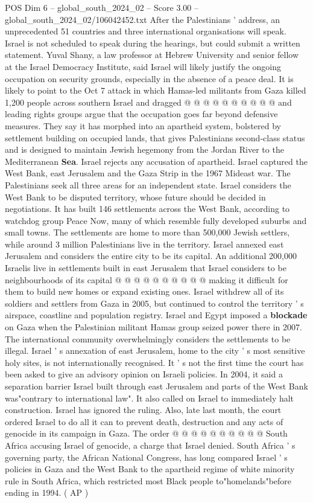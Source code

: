 \begin{textsample}{POS Dim 6 – global\_south\_2024\_02 – Score 3.00 – global\_south\_2024\_02/106042452.txt}
After the Palestinians ' address, an unprecedented 51 countries and three international organisations will speak.
Israel is not scheduled to speak during the hearings, but could submit a written statement.
Yuval Shany, a law professor at Hebrew University and senior fellow at the Israel Democracy Institute, said Israel will likely justify the ongoing occupation on security grounds, especially in the absence of a peace deal.
It is likely to point to the Oct 7 attack in which Hamas-led militants from Gaza killed 1,200 people across southern Israel and dragged @ @ @ @ @ @ @ @ @ @ and leading rights groups argue that the occupation goes far beyond defensive measures.
They say it has morphed into an apartheid system, bolstered by settlement building on occupied lands, that gives Palestinians second-class status and is designed to maintain Jewish hegemony from the Jordan River to the Mediterranean \textbf{Sea}.
Israel rejects any accusation of apartheid.
Israel captured the West Bank, east Jerusalem and the Gaza Strip in the 1967 Mideast war.
The Palestinians seek all three areas for an independent state.
Israel considers the West Bank to be disputed territory, whose future should be decided in negotiations.
It has built 146 settlements across the West Bank, according to watchdog group Peace Now, many of which resemble fully developed suburbs and small towns.
The settlements are home to more than 500,000 Jewish settlers, while around 3 million Palestinians live in the territory.
Israel annexed east Jerusalem and considers the entire city to be its capital.
An additional 200,000 Israelis live in settlements built in east Jerusalem that Israel considers to be neighbourhoods of its capital @ @ @ @ @ @ @ @ @ @ making it difficult for them to build new homes or expand existing ones.
Israel withdrew all of its soldiers and settlers from Gaza in 2005, but continued to control the territory ' s airspace, coastline and population registry.
Israel and Egypt imposed a \textbf{blockade} on Gaza when the Palestinian militant Hamas group seized power there in 2007.
The international community overwhelmingly considers the settlements to be illegal.
Israel ' s annexation of east Jerusalem, home to the city ' s most sensitive holy sites, is not internationally recognised.
It ' s not the first time the court has been asked to give an advisory opinion on Israeli policies.
In 2004, it said a separation barrier Israel built through east Jerusalem and parts of the West Bank was"contrary to international law".
It also called on Israel to immediately halt construction.
Israel has ignored the ruling.
Also, late last month, the court ordered Israel to do all it can to prevent death, destruction and any acts of genocide in its campaign in Gaza.
The order @ @ @ @ @ @ @ @ @ @ South Africa accusing Israel of genocide, a charge that Israel denied.
South Africa ' s governing party, the African National Congress, has long compared Israel ' s policies in Gaza and the West Bank to the apartheid regime of white minority rule in South Africa, which restricted most Black people to"homelands"before ending in 1994. ( AP )

\end{textsample}
